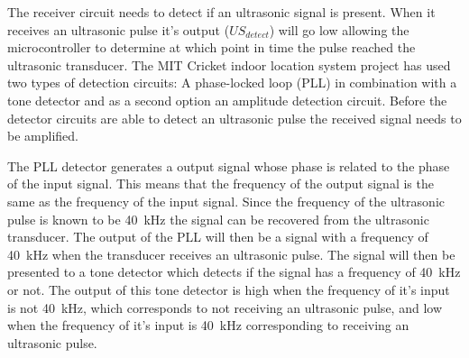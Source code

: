 The receiver circuit needs to detect if an ultrasonic signal is present.
When it receives an ultrasonic pulse it's output ($US_{detect}$) will go low allowing the microcontroller to determine at which point in time the pulse reached the ultrasonic transducer.
The MIT Cricket indoor location system \cite{Balakrishnan2003, Priyantha2000} project has used two types of detection circuits: A phase-locked loop (PLL) in combination with a tone detector and as a second option an amplitude detection circuit.
Before the detector circuits are able to detect an ultrasonic pulse the received signal needs to be amplified.

The PLL detector generates a output signal whose phase is related to the phase of the input signal.
This means that the frequency of the output signal is the same as the frequency of the input signal.
Since the frequency of the ultrasonic pulse is known to be \SI{40}{\kilo\hertz}
the signal can be recovered from the ultrasonic transducer.
The output of the PLL will then be a signal with a frequency of \SI{40}{\kilo\hertz} when the transducer receives an ultrasonic pulse.
The signal will then be presented to a tone detector which detects if the signal has a frequency of \SI{40}{\kilo\hertz} or not.
The output of this tone detector is high when the frequency of it's input is not \SI{40}{\kilo\hertz}, which corresponds to not receiving an ultrasonic pulse, and low when the frequency of it's input is \SI{40}{\kilo\hertz} corresponding to receiving an ultrasonic pulse.


